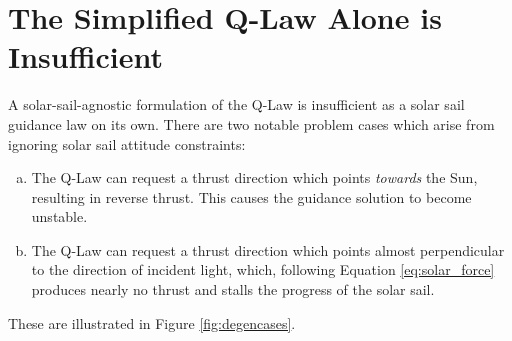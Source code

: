 \section{The Simplified Q-Law Alone is Insufficient}
\label{sec:insufficient}
A solar-sail-agnostic formulation of the Q-Law is insufficient as a solar sail guidance law on its own. There are two notable problem cases which arise from ignoring solar sail attitude constraints:
\begin{enumerate}[(a)]
    \item The Q-Law can request a thrust direction which points \textit{towards} the Sun, resulting in reverse thrust. This causes the guidance solution to become unstable.
    \item The Q-Law can request a thrust direction which points almost perpendicular to the direction of incident light, which, following Equation \ref{eq:solar_force} produces nearly no thrust and stalls the progress of the solar sail.
\end{enumerate}

These are illustrated in Figure \ref{fig:degencases}.

